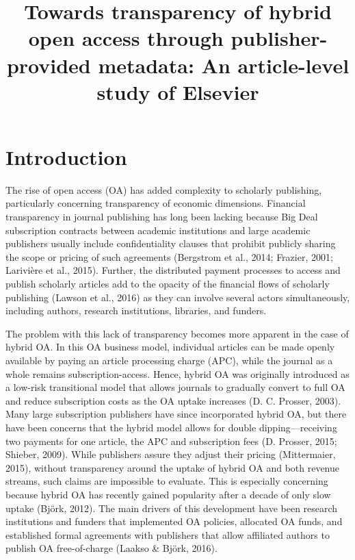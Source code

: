 \documentclass[a4paper,man,floatsintext,longtable,noextraspace,12pt]{apa6}
\title{\textbf{Towards transparency of hybrid open access through publisher-provided metadata: An article-level study of Elsevier}}
\begin{document}
\maketitle

\hypertarget{introduction}{%
\section{Introduction}\label{introduction}}

The rise of open access (OA) has added complexity to scholarly
publishing, particularly concerning transparency of economic dimensions.
Financial transparency in journal publishing has long been lacking
because Big Deal subscription contracts between academic institutions
and large academic publishers usually include confidentiality clauses
that prohibit publicly sharing the scope or pricing of such agreements
(Bergstrom et al., 2014; Frazier, 2001; Larivière et al., 2015).
Further, the distributed payment processes to access and publish
scholarly articles add to the opacity of the financial flows of
scholarly publishing (Lawson et al., 2016) as they can involve several
actors simultaneously, including authors, research institutions,
libraries, and funders.

The problem with this lack of transparency becomes more apparent in the
case of hybrid OA. In this OA business model, individual articles can be
made openly available by paying an article processing charge (APC),
while the journal as a whole remains subscription-access. Hence, hybrid
OA was originally introduced as a low-risk transitional model that
allows journals to gradually convert to full OA and reduce subscription
costs as the OA uptake increases (D. C. Prosser, 2003). Many large
subscription publishers have since incorporated hybrid OA, but there
have been concerns that the hybrid model allows for double
dipping---receiving two payments for one article, the APC and
subscription fees (D. Prosser, 2015; Shieber, 2009). While publishers
assure they adjust their pricing (Mittermaier, 2015), without
transparency around the uptake of hybrid OA and both revenue streams,
such claims are impossible to evaluate. This is especially concerning
because hybrid OA has recently gained popularity after a decade of only
slow uptake (Björk, 2012). The main drivers of this development have
been research institutions and funders that implemented OA policies,
allocated OA funds, and established formal agreements with publishers
that allow affiliated authors to publish OA free-of-charge (Laakso \&
Björk, 2016).
\end{document}
